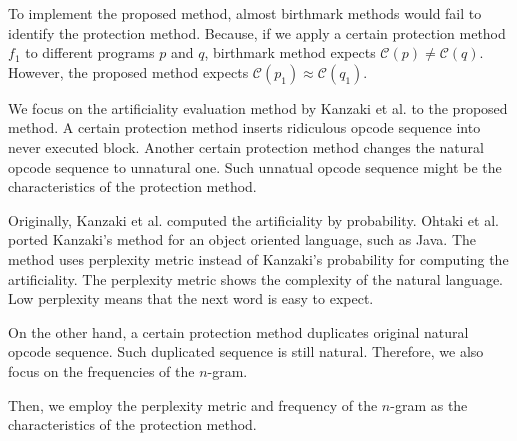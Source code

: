 \documentclass[conference]{IEEEtran}
\newcommand{\birth}[1]{\mathcal{C}(#1)}
\begin{document}
To implement the proposed method, almost birthmark methods would fail
to identify the protection method.  Because, if we apply a certain
protection method $f_1$ to different programs $p$ and $q$, birthmark
method expects $\birth{p} \neq \birth{q}$.  However, the proposed
method expects $\birth{p_1} \approx \birth{q_1}$.

We focus on the artificiality evaluation method by Kanzaki et al. to
the proposed method.  A certain protection method inserts ridiculous
opcode sequence into never executed block.  Another certain protection
method changes the natural opcode sequence to unnatural one.  Such
unnatual opcode sequence might be the characteristics of the
protection method.

Originally, Kanzaki et al. computed the artificiality by probability.
Ohtaki et al. ported Kanzaki's method for an object oriented language,
such as Java\cite{gekka14scis}.  The method uses perplexity metric
instead of Kanzaki's probability for computing the artificiality.  The
perplexity metric shows the complexity of the natural language.  Low
perplexity means that the next word is easy to expect.

On the other hand, a certain protection method duplicates original
natural opcode sequence.  Such duplicated sequence is still natural.
Therefore, we also focus on the frequencies of the $n$-gram.

Then, we employ the perplexity metric and frequency of the $n$-gram as
the characteristics of the protection method.
\end{document}

